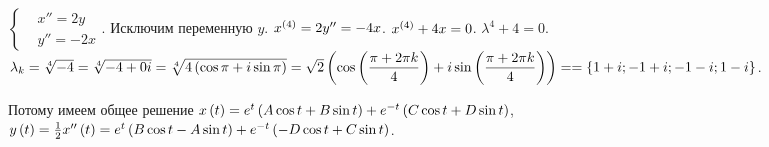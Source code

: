 \documentclass[a5paper,10pt]{article}
\begin{document}
$\left\{\begin{aligned}
    & x'' = 2y \\
    & y'' = -2x
\end{aligned}\right..$ Исключим переменную $y$. $x^{\left(4\right)} = 2y'' = -4x$. $x^{\left(4\right)} + 4x = 0$. $\lambda^4 + 4 = 0$. $\lambda_{k} = \sqrt[4]{-4} = \sqrt[4]{-4 + 0i} = \sqrt[4]{4\br{\cos \pi + i \sin \pi}} = \sqrt{2} \br{ \cos \br{\dfrac {\pi + 2 \pi k} {4}} + i \sin \br{\dfrac {\pi + 2 \pi k} {4}} } = \linebreak = \cbr{1 + i; -1 + i; -1 - i; 1 - i}$.

Потому имеем общее решение $x\left(t\right) = e^{t} \left(A \cos t + B \sin t\right) + e^{-t} \left(C \cos t + D \sin t\right)$, $y\left(t\right) = \frac {1} {2} x''\left(t\right) = e^{t} \left(B \cos t - A \sin t\right) + e^{-t} \left(-D \cos t + C \sin t\right)$.
\end{document}
